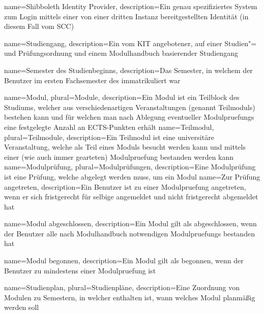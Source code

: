 {
	name=Shibboleth Identity Provider,
	description={Ein genau spezifiziertes System zum Login mittels einer von einer dritten Instanz bereitgestellten Identität (in diesem Fall vom \gls{SCC})}
}

{
	name=Studiengang,
	description={Ein vom KIT angebotener, auf einer Studien"= und Prüfungsordnung und einem Modulhandbuch basierender Studiengang}
}

{
	name=Semester des Studienbeginns,
	description={Das Semester, in welchem der \gls{Benutzer} im ersten Fachsemester des  immatrikuliert war}
}

{
	name=Modul,
	plural=Module,
	description={Ein Modul ist ein Teilblock des Studiums, welcher aus verschiedenartigen Veranstaltungen (genannt \glspl{Teilmodul}) bestehen kann und für welchen man nach Ablegung eventueller \glspl{Modulpruefung} eine festgelegte Anzahl an ECTS-Punkten erhält}
}
{
	name=Teilmodul,
	plural=Teilmodule,
	description={Ein Teilmodul ist eine universitäre Veranstaltung, welche als Teil eines Moduls besucht werden kann und mittels einer (wie auch immer gearteten) \gls{Modulpruefung} bestanden werden kann}
}
{
	name=Modulprüfung,
	plural=Modulprüfungen,
	description={Eine Modulprüfung ist eine Prüfung, welche abgelegt werden muss, um ein Modul }
}
{
	name=Zur Prüfung angetreten,
	description={Ein \gls{Benutzer} ist zu einer \gls{Modulpruefung} angetreten, wenn er sich fristgerecht für selbige angemeldet und nicht fristgerecht abgemeldet hat}
}

{
	name=Modul abgeschlossen,
	description={Ein \gls{Modul} gilt als abgeschlossen, wenn der \gls{Benutzer} alle nach Modulhandbuch notwendigen \glspl{Modulpruefung} bestanden hat}
}

{
	name=Modul begonnen,
	description={Ein \gls{Modul} gilt als begonnen, wenn der \gls{Benutzer} zu mindestens einer \gls{Modulpruefung}  ist}
}

{
	name=Studienplan,
	plural=Studienpläne,
	description={Eine Zuordnung von Modulen zu Semestern, in welcher enthalten ist, wann welches Modul planmäßig  werden soll}
}







